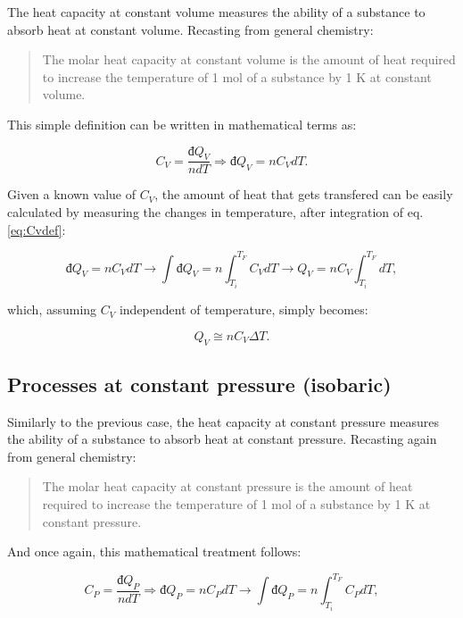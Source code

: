 \documentclass[
  9pt,
]{extbook}
\theoremstyle{definition}
\theoremstyle{definition}
\theoremstyle{definition}
\theoremstyle{remark}
\begin{document}
The heat capacity at constant volume measures the ability of a substance to absorb heat at constant volume. Recasting from general chemistry:

\begin{quote}
The molar heat capacity at constant volume is the amount of heat required to increase the temperature of 1 mol of a substance by 1 K at constant volume.
\end{quote}

This simple definition can be written in mathematical terms as:

\begin{equation}
  C_V = \frac{đ Q_V}{n dT} \Rightarrow đ Q_V = n C_V dT.
  \label{eq:Cvdef}
\end{equation}

Given a known value of \(C_V\), the amount of heat that gets transfered can be easily calculated by measuring the changes in temperature, after integration of eq. \eqref{eq:Cvdef}:

\begin{equation}
  đ Q_V = n C_V dT \rightarrow \int đ Q_V = n \int_{T_i}^{T_F}C_V dT \rightarrow Q_V = n C_V \int_{T_i}^{T_F}dT,
  \label{eq:Cvint1}
\end{equation}

which, assuming \(C_V\) independent of temperature, simply becomes:

\begin{equation}
  Q_V \cong n C_V \Delta T.
  \label{eq:Cvint}
\end{equation}

\hypertarget{heatconstp}{%
\subsection{Processes at constant pressure (isobaric)}\label{heatconstp}}

Similarly to the previous case, the heat capacity at constant pressure measures the ability of a substance to absorb heat at constant pressure. Recasting again from general chemistry:

\begin{quote}
The molar heat capacity at constant pressure is the amount of heat required to increase the temperature of 1 mol of a substance by 1 K at constant pressure.
\end{quote}

And once again, this mathematical treatment follows:

\begin{equation}
  C_P = \frac{đ Q_P}{n dT} \Rightarrow đ Q_P = n C_P dT \rightarrow \int đ Q_P = n \int_{T_i}^{T_F}C_P dT,
  \label{eq:Cpdef}
\end{equation}
\end{document}
